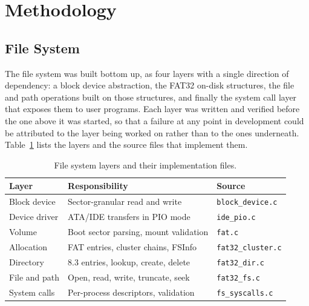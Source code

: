 
\section{Methodology}
\subsection{File System}

The file system was built bottom up, as four layers with a single direction of
dependency: a block device abstraction, the FAT32 on-disk structures, the file
and path operations built on those structures, and finally the system call
layer that exposes them to user programs. Each layer was written and verified
before the one above it was started, so that a failure at any point in
development could be attributed to the layer being worked on rather than to
the ones underneath. Table~\ref{tab:fs-layers} lists the layers and the source
files that implement them.

\begin{table}[H]
    \centering
    \begin{tabular}{|l|l|l|}
        \hline
        \textbf{Layer} & \textbf{Responsibility} & \textbf{Source} \\
        \hline
        Block device & Sector-granular read and write & \texttt{block\_device.c} \\
        Device driver & ATA/IDE transfers in PIO mode & \texttt{ide\_pio.c} \\
        Volume & Boot sector parsing, mount validation & \texttt{fat.c} \\
        Allocation & FAT entries, cluster chains, FSInfo & \texttt{fat32\_cluster.c} \\
        Directory & 8.3 entries, lookup, create, delete & \texttt{fat32\_dir.c} \\
        File and path & Open, read, write, truncate, seek & \texttt{fat32\_fs.c} \\
        System calls & Per-process descriptors, validation & \texttt{fs\_syscalls.c} \\
        \hline
    \end{tabular}
    \caption{File system layers and their implementation files.}
    \label{tab:fs-layers}
\end{table}

